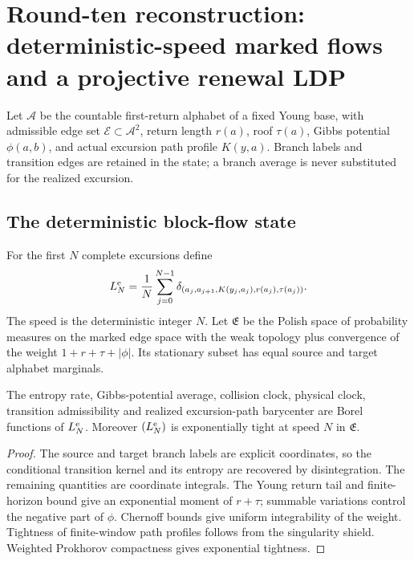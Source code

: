 \section{Round-ten reconstruction: deterministic-speed marked flows and a projective renewal LDP}
\label{sec:r10-a3}

Let \(\mathcal A\) be the countable first-return alphabet of a fixed Young
base, with admissible edge set \(\mathcal E\subset\mathcal A^2\), return length
\(r(a)\), roof \(\tau(a)\), Gibbs potential \(\phi(a,b)\), and actual
excursion path profile \(K(y,a)\).  Branch labels and transition edges are
retained in the state; a branch average is never substituted for the realized
excursion.

\subsection{The deterministic block-flow state}

For the first \(N\) complete excursions define
\[
 L_N^{\rm e}=\frac1N\sum_{j=0}^{N-1}
 \delta_{(a_j,a_{j+1},K(y_j,a_j),r(a_j),\tau(a_j))}.
\]
The speed is the deterministic integer \(N\).  Let \(\mathfrak E\) be the
Polish space of probability measures on the marked edge space with the weak
topology plus convergence of the weight \(1+r+\tau+|\phi|\).  Its stationary
subset has equal source and target alphabet marginals.

\begin{lemma}
\label{lem:r10-a3-state}
The entropy rate, Gibbs-potential average, collision clock, physical clock,
transition admissibility and realized excursion-path barycenter are Borel
functions of \(L_N^{\rm e}\).  Moreover \((L_N^{\rm e})\) is exponentially
tight at speed \(N\) in \(\mathfrak E\).
\end{lemma}

\begin{proof}
The source and target branch labels are explicit coordinates, so the
conditional transition kernel and its entropy are recovered by disintegration.
The remaining quantities are coordinate integrals.  The Young return tail and
finite-horizon bound give an exponential moment of \(r+\tau\); summable
variations control the negative part of \(\phi\).  Chernoff bounds give
uniform integrability of the weight.  Tightness of finite-window path profiles
follows from the singularity shield.  Weighted Prokhorov compactness gives
exponential tightness.
\end{proof}


